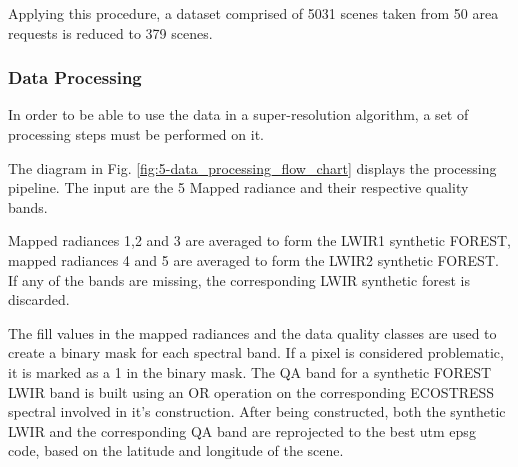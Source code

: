     Applying this procedure, a dataset comprised of 5031 scenes taken from 50 area requests is reduced to 379 scenes.

    \subsubsection{Data Processing}

    In order to be able to use the data in a super-resolution algorithm, a set of processing steps must be performed on it.

    The diagram in Fig. \ref{fig:5-data_processing_flow_chart} displays the processing pipeline. The input are the 5 Mapped radiance and their respective quality bands.

    Mapped radiances 1,2 and 3 are averaged to form the LWIR1 synthetic FOREST, mapped radiances 4 and 5 are averaged to form the LWIR2 synthetic FOREST. If any of the bands are missing, the corresponding LWIR synthetic forest is discarded. 

    The fill values in the mapped radiances and the data quality classes are used to create a binary mask for each spectral band. If a pixel is considered problematic, it is marked as a 1 in the binary mask. The QA band for a synthetic FOREST LWIR band is built using an OR operation on the corresponding ECOSTRESS spectral involved in it's construction. After being constructed, both the synthetic LWIR and the corresponding QA band are reprojected to the best utm epsg code, based on the latitude and longitude of the scene.

